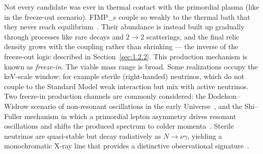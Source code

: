 Not every candidate was ever in thermal contact with the primordial plasma (like in the freeze-out scenario).
\Glspl{FIMP_} couple so weakly to the thermal bath that they never reach equilibrium~\cite{Hall:2009bx}.
Their abundance is instead built up gradually through processes like rare decays and $2 \to 2$ scatterings, and the final relic density grows with the coupling rather than shrinking --- the inverse of the freeze-out logic described in Section~\ref{sec:1.2.2}.
This production mechanism is known as \emph{freeze-in}.
The viable \FIMP mass range is broad. Some realizations occupy the keV-scale window: for example sterile (right-handed) neutrinos, which do not couple to the Standard Model weak interaction but mix with active neutrinos.
Two freeze-in production channels are commonly considered: the Dodelson--Widrow scenario of non-resonant oscillations in the early Universe~\cite{Dodelson:1993je}, and the Shi--Fuller mechanism in which a primordial lepton asymmetry drives resonant oscillations and shifts the produced spectrum to colder momenta~\cite{Shi:1998km}.
Sterile neutrinos are quasi-stable but decay radiatively as $N \to \nu\gamma$, yielding a monochromatic X-ray line that provides a distinctive observational signature~\cite{Boyarsky:2018tvu,Drewes:2016upu}.



